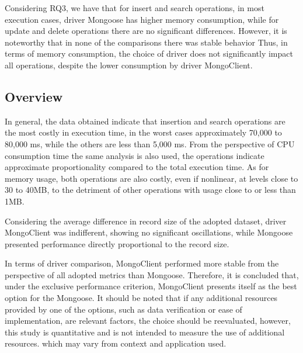 \documentclass{svproc}
\begin{document}
Considering RQ3, we have that for insert and search operations, in most execution cases, driver Mongoose has higher memory consumption, while for update and delete operations there are no significant differences.
However, it is noteworthy that in none of the comparisons there was stable behavior
Thus, in terms of memory consumption, the choice of driver does not significantly impact all operations, despite the lower consumption by driver MongoClient.

\subsection{Overview}
\label{qgeral}

In general, the data obtained indicate that insertion and search operations are the most costly in execution time, in the worst cases approximately 70,000 to 80,000 ms, while the others are less than 5,000 ms.
From the perspective of CPU consumption time the same analysis is also used, the operations indicate approximate proportionality compared to the total execution time.
As for memory usage, both operations are also costly, even if nonlinear, at levels close to 30 to 40MB, to the detriment of other operations with usage close to or less than 1MB.

Considering the average difference in record size of the adopted dataset, driver MongoClient was indifferent, showing no significant oscillations, while Mongoose presented performance directly proportional to the record size.

In terms of driver comparison, MongoClient performed more stable from the perspective of all adopted metrics than Mongoose. Therefore, it is concluded that, under the exclusive performance criterion, MongoClient presents itself as the best option for the Mongoose. It should be noted that if any additional resources provided by one of the options, such as data verification or ease of implementation, are relevant factors, the choice should be reevaluated, however, this study is quantitative and is not intended to measure the use of additional resources. which may vary from context and application used.


\end{document}
